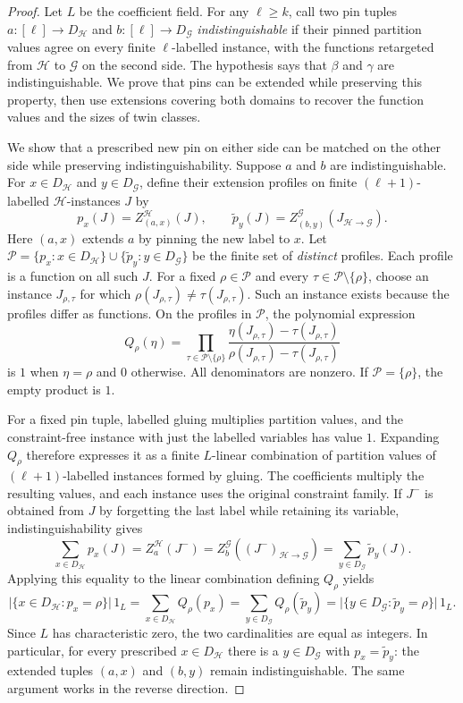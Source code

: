 \documentclass[11pt,letterpaper,onecolumn]{article}
\theoremstyle{plain}
\theoremstyle{definition}
\theoremstyle{remark}
\begin{document}
\begin{proof}
Let $L$ be the coefficient field.  For any $\ell\ge k$, call two pin tuples
$a:[\ell]\to D_{\mathcal H}$ and $b:[\ell]\to D_{\mathcal G}$ \emph{indistinguishable} if their
pinned partition values agree on every finite $\ell$-labelled instance,
with the functions retargeted from $\mathcal H$ to $\mathcal G$ on the
second side.  The hypothesis says that $\beta$ and $\gamma$ are
indistinguishable.  We prove that pins can be extended while preserving
this property, then use extensions covering both domains to recover the
function values and the sizes of twin classes.

We show that a prescribed new pin on either side can be matched on the
other side while preserving indistinguishability.
Suppose $a$ and $b$ are indistinguishable.  For $x\in D_{\mathcal H}$ and $y\in D_{\mathcal G}$,
define their extension profiles on finite $(\ell+1)$-labelled
$\mathcal H$-instances $J$ by
\[
  p_x(J)=Z^{\mathcal H}_{(a,x)}(J),
  \qquad
  \widetilde p_y(J)=Z^{\mathcal G}_{(b,y)}(J_{\mathcal H\to\mathcal G}).
\]
Here $(a,x)$ extends $a$ by pinning the new label to $x$.  Let
$\mathcal P=\{p_x:x\in D_{\mathcal H}\}\cup\{\widetilde p_y:y\in D_{\mathcal G}\}$ be the finite set of
\emph{distinct} profiles. Each profile is a function on all such $J$.
For a fixed $\rho\in\mathcal P$ and every
$\tau\in\mathcal P\setminus\{\rho\}$, choose an instance
$J_{\rho,\tau}$ for which
$\rho(J_{\rho,\tau})\ne\tau(J_{\rho,\tau})$.  Such an instance exists
because the profiles differ as functions.  On the profiles in $\mathcal P$,
the polynomial expression
\[
  Q_\rho(\eta)
  =\prod_{\tau\in\mathcal P\setminus\{\rho\}}
    \frac{\eta(J_{\rho,\tau})-\tau(J_{\rho,\tau})}
         {\rho(J_{\rho,\tau})-\tau(J_{\rho,\tau})}
\]
is $1$ when $\eta=\rho$ and $0$ otherwise.  All denominators are nonzero.
If $\mathcal P=\{\rho\}$, the empty product is $1$.

For a fixed pin tuple, labelled gluing multiplies partition values, and
the constraint-free instance with just the labelled variables has value
$1$.  Expanding $Q_\rho$ therefore expresses it as a finite $L$-linear
combination of partition values of $(\ell+1)$-labelled instances formed
by gluing.  The coefficients multiply the resulting values, and each
instance uses the original constraint family.
If $J^-$ is obtained from $J$ by forgetting the last label while retaining
its variable, indistinguishability gives
\[
  \sum_{x\in D_{\mathcal H}}p_x(J)
  =Z_a^{\mathcal H}(J^-)
  =Z_b^{\mathcal G}((J^-)_{\mathcal H\to\mathcal G})
  =\sum_{y\in D_{\mathcal G}}\widetilde p_y(J).
\]
Applying this equality to the linear combination defining $Q_\rho$ yields
\[
  \bigl|\{x\in D_{\mathcal H}:p_x=\rho\}\bigr|\,1_L
  =\sum_{x\in D_{\mathcal H}}Q_\rho(p_x)
  =\sum_{y\in D_{\mathcal G}}Q_\rho(\widetilde p_y)
  =\bigl|\{y\in D_{\mathcal G}:\widetilde p_y=\rho\}\bigr|\,1_L.
\]
Since $L$ has characteristic zero, the two cardinalities are equal as
integers.  In particular, for every prescribed $x\in D_{\mathcal H}$ there is a
$y\in D_{\mathcal G}$ with $p_x=\widetilde p_y$: the extended tuples $(a,x)$ and $(b,y)$ remain
indistinguishable.  The same argument works in the reverse direction.


\end{proof}
\end{document}
